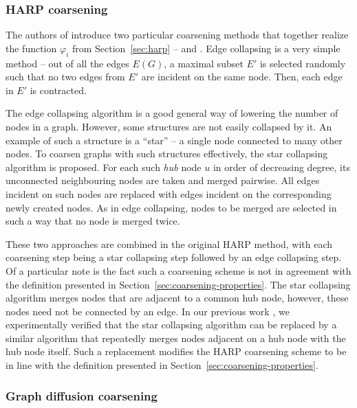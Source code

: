 \subsubsection{HARP coarsening}\label{sec:harp-coarsening}

The authors of \cite{chen_harp_2018} introduce two particular coarsening methods that together realize the function \( \varphi_i \) from Section~\ref{sec:harp} --  and . Edge collapsing is a very simple method -- out of all the edges \( E \left( G \right) \), a maximal subset \( E' \) is selected randomly such that no two edges from \( E' \) are incident on the same node. Then, each edge in \( E' \) is contracted.

The edge collapsing algorithm is a good general way of lowering the number of nodes in a graph. However, some structures are not easily collapsed by it. An example of such a structure is a \enquote{star} -- a single node connected to many other nodes. To coarsen graphs with such structures effectively, the star collapsing algorithm is proposed. For each such \textit{hub} node \( u \) in order of decreasing degree, its unconnected neighbouring nodes are taken and merged pairwise. All edges incident on such nodes are replaced with edges incident on the corresponding newly created nodes. As in edge collapsing, nodes to be merged are selected in such a way that no node is merged twice.

These two approaches are combined in the original HARP method, with each coarsening step being a star collapsing step followed by an edge collapsing step. Of a particular note is the fact such a coarsening scheme is not in agreement with the definition presented in Section~\ref{sec:coarsening-properties}. The star collapsing algorithm merges nodes that are adjacent to a common hub node, however, these nodes need not be connected by an edge. In our previous work \cite{dedic_graph_2021}, we experimentally verified that the star collapsing algorithm can be replaced by a similar algorithm that repeatedly merges nodes adjacent on a hub node with the hub node itself. Such a replacement modifies the HARP coarsening scheme to be in line with the definition presented in Section~\ref{sec:coarsening-properties}.

\subsubsection{Graph diffusion coarsening}\label{sec:gdc-coarsening}

